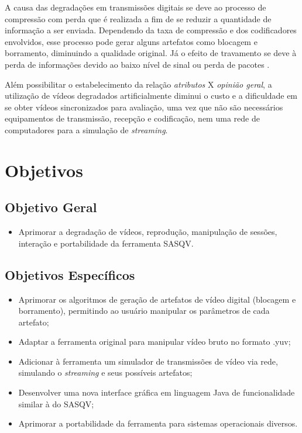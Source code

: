 A causa das degradações em transmissões digitais se deve ao processo de compressão com perda que é realizada a fim de se reduzir a quantidade de informação a ser enviada. Dependendo da taxa de compressão e dos codificadores envolvidos, esse processo pode gerar alguns artefatos como blocagem e borramento, diminuindo a qualidade original. Já o efeito de travamento se deve à perda de informações devido ao baixo nível de sinal ou perda de pacotes \cite{albini}.

Além possibilitar o estabelecimento da relação \emph{atributos} X \emph{opinião geral}, a utilização de vídeos degradados artificialmente diminui o custo e a dificuldade em se obter vídeos sincronizados para avaliação, uma vez que não são necessários equipamentos de transmissão, recepção e codificação, nem uma rede de computadores para a simulação de \emph{streaming}.

\section{Objetivos}
\subsection{Objetivo Geral}

\begin{itemize}
    \item Aprimorar a degradação de vídeos, reprodução, manipulação de sessões, interação e portabilidade da ferramenta SASQV.
\end{itemize}

\subsection{Objetivos Específicos}

\begin{itemize}
    \item Aprimorar os algoritmos de geração de artefatos de vídeo digital (blocagem e borramento), permitindo ao usuário manipular os parâmetros de cada artefato;
    \item Adaptar a ferramenta original para manipular vídeo bruto no formato .yuv;
    \item Adicionar à ferramenta um simulador de transmissões de vídeo via rede, simulando o \emph{streaming} e seus possíveis artefatos;
    \item Desenvolver uma nova interface gráfica em linguagem Java de funcionalidade similar à do SASQV;
    \item Aprimorar a portabilidade da ferramenta para sistemas operacionais diversos.
\end{itemize}

